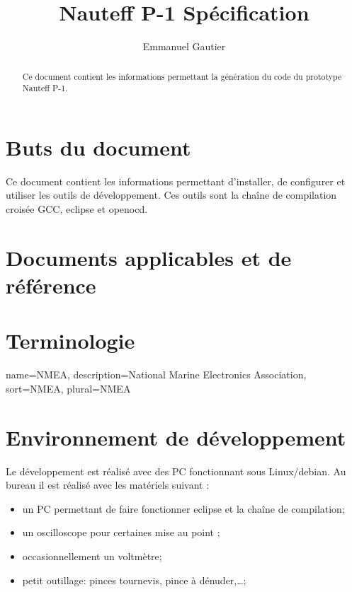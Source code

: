 \documentclass[a4paper,11pt]{report}
\title{Nauteff P-1 Spécification}
\author{Emmanuel Gautier}
\begin{document}
\maketitle

\begin{abstract}
Ce document contient les informations permettant la génération du code du prototype Nauteff P-1.
\end{abstract}

\tableofcontents
\chapter{Buts du document}
Ce document contient les informations permettant d'installer, de configurer et utiliser les outils de développement. Ces outils sont la chaîne de compilation croisée GCC, eclipse et openocd. 
\chapter{Documents applicables et de référence}
\chapter{Terminologie}
{
	name={NMEA}, %
	description={National Marine Electronics Association}, %
	sort={NMEA}, %
	plural={NMEA} %
}

\printglossary

\chapter{Environnement de développement}
Le développement est réalisé avec des PC fonctionnant sous Linux/debian.
Au bureau il est réalisé avec les matériels suivant :
\begin{itemize}
	\item un PC permettant de faire fonctionner eclipse et la chaîne de compilation;
	\item un oscilloscope pour certaines mise au point ;
	\item occasionnellement un voltmètre;
	\item petit outillage: pinces tournevis, pince à dénuder,\ldots;
\end{itemize}
\end{document}
